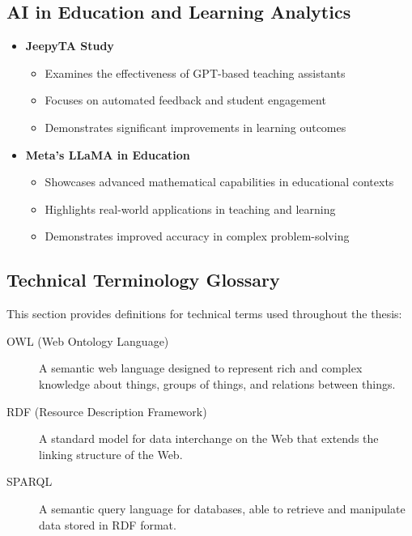 \subsection{AI in Education and Learning Analytics}
\begin{itemize}
    \item \textbf{JeepyTA Study}
        \begin{itemize}
            \item Examines the effectiveness of GPT-based teaching assistants
            \item Focuses on automated feedback and student engagement
            \item Demonstrates significant improvements in learning outcomes
        \end{itemize}
    
    \item \textbf{Meta's LLaMA in Education}
        \begin{itemize}
            \item Showcases advanced mathematical capabilities in educational contexts
            \item Highlights real-world applications in teaching and learning
            \item Demonstrates improved accuracy in complex problem-solving
        \end{itemize}
\end{itemize}

\subsection{Technical Terminology Glossary}
\label{sec:technical-glossary}

This section provides definitions for technical terms used throughout the thesis:

\begin{description}
    \item[OWL (Web Ontology Language)] A semantic web language designed to represent rich and complex knowledge about things, groups of things, and relations between things.
    
    \item[RDF (Resource Description Framework)] A standard model for data interchange on the Web that extends the linking structure of the Web.
    
    \item[SPARQL] A semantic query language for databases, able to retrieve and manipulate data stored in RDF format.
\end{description}
